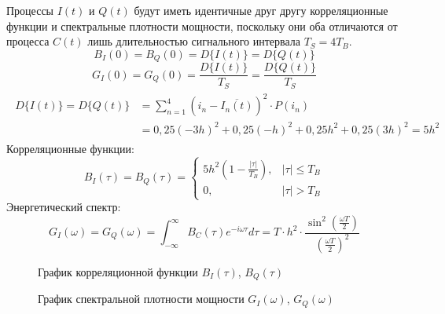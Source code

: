 \documentclass[a4paper, 12pt]{article}
\begin{document}
\begin{enumerate}
  Процессы $I(t)$ и $Q(t)$ будут иметь идентичные друг другу корреляционные функции и спектральные плотности 
  мощности, поскольку они оба отличаются от процесса 
  $C(t)$ лишь длительностью сигнального интервала 
  $T_S=4T_B$.
  \[ B_I(0)=B_Q(0)=D\{I(t)\}=D\{Q(t)\} \]
  \[ G_I(0)=G_Q(0)=\frac{D\{I(t)\}}{T_S}=\frac{D\{Q(t)\}}{T_S} \]
  \begin{align*}\begin{split}
    D\{I(t)\}=D\{Q(t)\}&
    =\sum^4_{n=1}(i_n-\overline{I_n(t)})^2\cdot P(i_n)\\
    &=0,25(-3h)^2+0,25(-h)^2+0,25h^2+0,25(3h)^2=5h^2
  \end{split}\end{align*}
  Корреляционные функции:
  \[ B_I(\tau)=B_Q(\tau)=\begin{cases}
    5h^2(1-\frac{|\tau|}{T_B}), & |\tau|\leq T_B\\
    0, & |\tau| > T_B
  \end{cases} \]
  Энергетический спектр:
  \[ G_I(\omega)=G_Q(\omega)
  =\int^\infty_{-\infty}B_C(\tau)e^{-i\omega\tau}d\tau
  =T\cdot h^2\cdot\frac{\sin^2(\frac{\omega T}{2})}{(\frac{\omega T}{2})^2} \]
  \begin{figure}[H]
    \centering
    \caption{График корреляционной функции 
    $B_I(\tau)$, $B_Q(\tau)$}
  \end{figure}

  \begin{figure}[H]
    \centering
    \caption{График спектральной плотности мощности 
    $G_I(\omega)$, $G_Q(\omega)$}
  \end{figure}


\end{enumerate}
\end{document}
